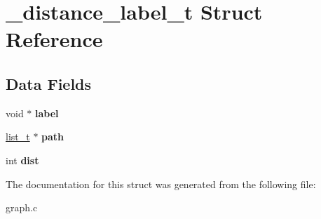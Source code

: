 \hypertarget{struct__distance__label__t}{}\section{\+\_\+distance\+\_\+label\+\_\+t Struct Reference}
\label{struct__distance__label__t}
\subsection*{Data Fields}
\begin{DoxyCompactItemize}
\item 
\hypertarget{struct__distance__label__t_a9727371f649142a741d5070a82f5878d}{}void $\ast$ {\bfseries label}\label{struct__distance__label__t_a9727371f649142a741d5070a82f5878d}

\item 
\hypertarget{struct__distance__label__t_af33f0d4f68780ceb38e73c1101274d79}{}\hyperlink{struct__list__t}{list\+\_\+t} $\ast$ {\bfseries path}\label{struct__distance__label__t_af33f0d4f68780ceb38e73c1101274d79}

\item 
\hypertarget{struct__distance__label__t_adbd84fd1b26dc8fd8eab79a772216aee}{}int {\bfseries dist}\label{struct__distance__label__t_adbd84fd1b26dc8fd8eab79a772216aee}

\end{DoxyCompactItemize}


The documentation for this struct was generated from the following file\+:\begin{DoxyCompactItemize}
\item 
graph.\+c\end{DoxyCompactItemize}
